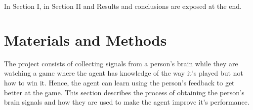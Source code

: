 \documentclass[journal]{IEEEtran}
\begin{document}
%



In Section I, in Section II and Results and conclusions are exposed at the end.

\section{Materials and Methods}

The project consists of collecting signals from a person's brain while they are watching a game where the agent has knowledge of the way it's played but not how to win it. Hence, the agent can learn using the person's feedback to get better at the game. This section describes the process of obtaining the person's brain signals and how they are used to make the agent improve it's performance.
\end{document}
